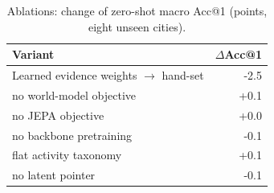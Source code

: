 \begin{table}[t]
\caption{Ablations: change of zero-shot macro Acc@1 (points, eight unseen cities).}
\label{tab:ablation}
\small
\begin{tabular}{lr}
\toprule
Variant & $\Delta$Acc@1 \\
\midrule
Learned evidence weights $\to$ hand-set & -2.5 \\
no world-model objective & +0.1 \\
no JEPA objective & +0.0 \\
no backbone pretraining & -0.1 \\
flat activity taxonomy & +0.1 \\
no latent pointer & -0.1 \\
\bottomrule
\end{tabular}
\end{table}
